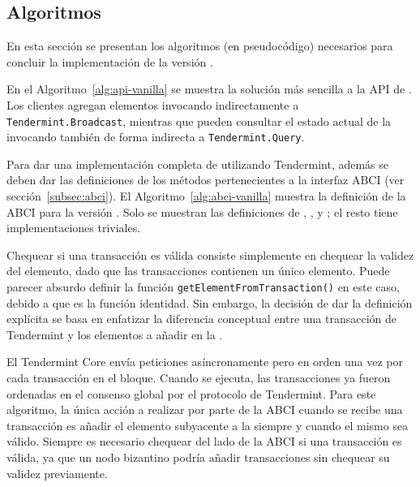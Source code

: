 
\subsection{Algoritmos}

En esta sección se presentan los algoritmos (en pseudocódigo) necesarios para concluir
la implementación de la versión \vanilla.
%


En el Algoritmo~\ref{alg:api-vanilla} se muestra la solución más sencilla a la API
de \setchain.
%
Los clientes agregan elementos invocando indirectamente a
\texttt{Tendermint.Broadcast}, mientras que pueden consultar el estado actual de
la \setchain invocando también de forma indirecta a \texttt{Tendermint.Query}.
%

Para dar una implementación completa de \setchain utilizando Tendermint, además se
deben dar las definiciones de los métodos pertenecientes a la interfaz ABCI
(ver sección~\ref{subsec:abci}). 
%
El Algoritmo~\ref{alg:abci-vanilla} muestra la definición de la ABCI para la versión
\vanilla.
%
Solo se muestran las definiciones de \CheckTx, \DeliverTx, \EndBlock y \Query;
el resto tiene implementaciones triviales.



Chequear si una transacción es válida consiste simplemente en chequear
la validez del elemento, dado que las transacciones contienen un único elemento.
%
Puede parecer absurdo definir la función \texttt{getElementFromTransaction()}
en este caso, debido a que es la función identidad. Sin embargo, la decisión de dar
la definición explícita se basa en enfatizar la diferencia conceptual entre una
transacción de Tendermint y los elementos a añadir en la \setchain.
%

El Tendermint Core envía peticiones \DeliverTx asíncronamente pero en orden
una vez por cada transacción en el bloque.
%
Cuando \DeliverTx se ejecuta, las transacciones ya fueron ordenadas en el consenso global por el protocolo
de Tendermint.
%
Para este algoritmo, la única acción a realizar por parte de la ABCI cuando se recibe una
transacción es añadir el elemento subyacente a la \setchain siempre y cuando el mismo
sea válido.
%
Siempre es necesario chequear del lado de la ABCI si una transacción es válida,
%
%
ya que un nodo bizantino podría añadir transacciones sin chequear
su validez previamente.
%

